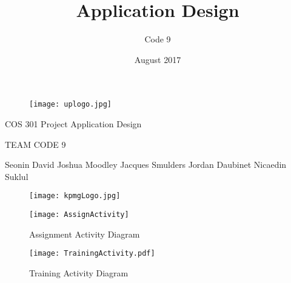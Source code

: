 \documentclass{article}
\title{Application Design}
\author{Code 9}
\date{August 2017}
\begin{document}
\selectfont
    \begin{center}\thispagestyle{empty}
    	\begin{figure}[h]
			\centering
			\texttt{[image: uplogo.jpg]}
	 	\end{figure}
    
        \newline
        {\Huge{} COS 301 Project \linebreak
        Application Design \linebreak 
        \par}
        
        {\Huge{}\selectfont
        TEAM CODE 9
        \linebreak
        \par}
        
        \begin{LARGE}\selectfont
            Seonin David
            \linebreak
            \linebreak
            Joshua Moodley
            \linebreak
            \linebreak
            Jacques Smulders
            \linebreak
            \linebreak
            Jordan Daubinet
            \linebreak
            \linebreak
            Nicaedin Suklul
        \end{LARGE}
    \end{center}
    
    \begin{figure}[b]
			\centering
			\texttt{[image: kpmgLogo.jpg]}
	\end{figure}  
    
    \newpage
	\clearpage
    \newpage

\begin{figure}[h]
\caption{Assignment Activity Diagram}
\centering
\texttt{[image: AssignActivity]}
\centering
\end{figure}

\begin{figure}[h]
\caption{Training Activity Diagram}
\centering
\texttt{[image: TrainingActivity.pdf]}
\centering
\end{figure}
\end{document}
